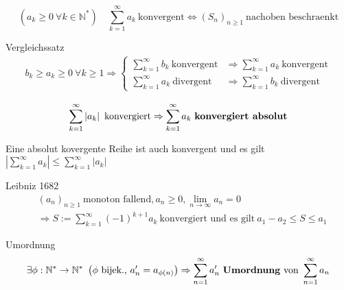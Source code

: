 \documentclass[8pt,a4paper,twocolumn]{extarticle}
\newcommand{\N}{\mathbb{N}}
\newcommand{\seq}[1]{\left( #1_n \right)_{n \ge 1}}
\begin{document}
\begin{satz}{2.42}
    \[
        (a_k \ge 0\ \forall k \in \N^*)
        \quad 
        \sum_{k=1}^\infty a_k\ \mbox{konvergent}
        \Leftrightarrow
        \seq{S}\ \mbox{nachoben beschraenkt}
    \]
\end{satz}

\begin{korollar}{2.43} Vergleichssatz
    \begin{align*}
        b_k \ge a_k \ge 0\ \forall k \ge 1
        \Rightarrow \begin{cases}
            \sum_{k=1}^\infty b_k\ \mbox{konvergent} &\Rightarrow \sum_{k=1}^\infty a_k\ \mbox{konvergent}\\
            \sum_{k=1}^\infty a_k\ \mbox{divergent} &\Rightarrow \sum_{k=1}^\infty b_k\ \mbox{divergent}
        \end{cases}
    \end{align*}
\end{korollar}

\begin{definition}{2.45}
    \[ \sum_{k=1}^\infty \left| a_k \right|\ \mbox{konvergiert} \Rightarrow  \sum_{k=1}^\infty a_k\ \mbox{\textbf{konvergiert absolut}} \]
\end{definition}

\begin{satz}{2.46}
    Eine absolut kovergente Reihe ist auch konvergent und es gilt $\left| \sum_{k=1}^\infty a_k \right| \le \sum_{k=1}^\infty \left| a_k \right|$
\end{satz}

\begin{satz}{2.48} \par Leibniz 1682
    \begin{align*}
        &\seq{a}\ \mbox{monoton fallend}, a_n \ge 0, \lim_{n \to \infty} a_n = 0\\
        &\Rightarrow S := \sum_{k=1}^\infty (-1)^{k+1} a_k \ \mbox{konvergiert und es gilt}\ a_1 - a_2 \le S \le a_1
    \end{align*}
\end{satz}

\begin{definition}{2.50} \par Umordnung
    \[
    \exists \phi: \N^* \to \N^*\ \left( \phi\ \mbox{bijek.,}\ a'_n = a_{\phi(n)} \right)    
    \Rightarrow
    \sum_{n=1}^\infty a'_n\ \mbox{\textbf{Umordnung} von}\ \sum_{n=1}^\infty a_n
    \]
\end{definition}
\end{document}
